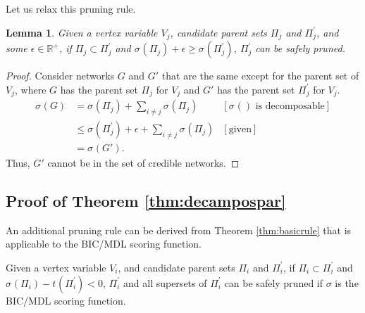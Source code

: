 \documentclass[letterpaper]{article}
\newcommand{\graph}{\mathit{G}}
\newcommand{\vertex}[1]{V_{#1}}
\newcommand{\score}[2]{\sigma_{#1}({#2})}
\newcommand{\pen}[2]{t_{#1}({#2})}
\newenvironment{customthm}[1]
  {\renewcommand\theinnercustomthm{#1}\innercustomthm}
  {\endinnercustomthm}
\newtheorem{lemma}{Lemma}
\begin{document}
Let us relax this pruning rule.
	\begin{lemma}
	Given a vertex variable $\vertex{j}$, candidate parent sets
	$\Pi_j$ and  $\Pi_j^{\prime}$, and some $\epsilon\in \mathbb{R}^+$,  if $\Pi_j \subset \Pi_j^{\prime}$ and $\score{}{\Pi_j} + \epsilon \geq \score{}{\Pi_j^{\prime}}$,
	$\Pi_j^{\prime}$ can be safely pruned. 
	\end{lemma}

	\begin{proof}
Consider networks $\graph$ and $\graph'$ that are the same except for the parent set of $\vertex{j}$, where $\graph$ has the parent set $\Pi_j$ for $\vertex{j}$ and $\graph'$ has the parent set $\Pi_j^{\prime}$ for $\vertex{j}$. 
\begin{align*}
    \score{}{\graph} &=  \score{}{\Pi_j} + \sum_{i\neq j} \score{}{\Pi_j}  &[\score{ }{}\text{ is decomposable}]\\
                    &\leq\score{}{\Pi_j^{\prime}} + \epsilon+ \sum_{i\neq j} \score{}{\Pi_j}  &[\text{given}]\\
                    &=\score{}{\graph'}.
\end{align*}
Thus, $\graph'$ cannot be in the set of credible  networks.
	\end{proof}
	
\subsection{Proof of Theorem \ref{thm:decampospar}}

An additional pruning rule can be derived from Theorem \ref{thm:basicrule} that is applicable to the BIC/MDL scoring function. 

\begin{customthm}{2A}\cite{CamposJ11}
Given a vertex variable $\vertex{i}$, and candidate parent sets $\Pi_i$ and $\Pi_i^{\prime}$,
	if $\Pi_i \subset \Pi_i^{\prime}$ and $\score{}{\Pi_i} -  \pen{}{\Pi_i^{\prime}} < 0$,
	$\Pi_i^{\prime}$ and all supersets of $\Pi_i^{\prime}$ can be safely pruned  if $\sigma$ is the BIC/MDL scoring function.    
\end{customthm}


\end{document}
